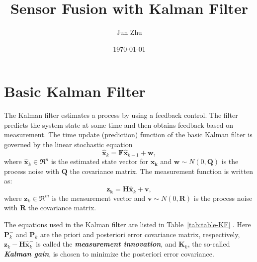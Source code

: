 \documentclass[12pt]{article}
\title{Sensor Fusion with Kalman Filter}
\author{Jun Zhu}
\date{\today}
\begin{document}
\maketitle


\section{Basic Kalman Filter}\label{basic-kalman-filter}

The Kalman filter estimates a process by using a feedback control. The filter predicts the system state at some time and then obtains feedback based on measurement. The time update (prediction) function of the basic Kalman filter is governed by the linear stochastic equation
%
\begin{equation}
	\mathbf{\hat{x}}_{k} = \mathbf{F}\mathbf{\hat{x}}_{k - 1} + \mathbf{w},
\end{equation}
%
where \(\mathbf{\hat{x}}_{k} \in \mathfrak{R}^{n}\) is the estimated state vector for \(\mathbf{x_k}\) and \(\mathbf{w}\sim N( 0,\mathbf{Q})\) is the process noise with \(\mathbf{Q}\) the covariance matrix. The measurement function is written as:
%
\begin{equation}
	\mathbf{z}_{\mathbf{k}} = \mathbf{H}\mathbf{\hat{x}}_{k} + \mathbf{v},
\end{equation}
%
where \(\mathbf{z}_{k} \in \mathfrak{R}^{m}\) is the measurement vector and \(\mathbf{v}\sim N( 0,\mathbf{R})\) is the process noise with \(\mathbf{R}\) the covariance matrix.

The equations used in the Kalman filter are listed in Table~\ref{tab:table-KF} \cite{Welch}. Here \(\mathbf{P}_{k}^{-}\) and \(\mathbf{P}_{k}\) are the priori and posteriori error covariance matrix, respectively, \(\mathbf{z}_{k} - \mathbf{H}\mathbf{\hat{x}}_{k}^{-}\) is called the \textbf{\textit{measurement innovation}}, and \(\mathbf{K}_{k}\), the so-called \textbf{\textit{Kalman gain}}, is chosen to minimize the posteriori error covariance.
\end{document}
